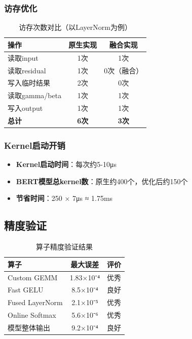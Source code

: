 \documentclass[12pt,a4paper]{article}
\begin{document}
\subsubsection{访存优化}

\begin{table}[H]
\centering
\caption{访存次数对比（以LayerNorm为例）}
\begin{tabular}{lcc}
\toprule
\textbf{操作} & \textbf{原生实现} & \textbf{融合实现} \\
\midrule
读取input & 1次 & 1次 \\
读取residual & 1次 & 0次（融合） \\
写入临时结果 & 2次 & 0次 \\
读取gamma/beta & 1次 & 1次 \\
写入output & 1次 & 1次 \\
\midrule
\textbf{总计} & \textbf{6次} & \textbf{3次} \\
\bottomrule
\end{tabular}
\end{table}

\subsubsection{Kernel启动开销}

\begin{itemize}
    \item \textbf{Kernel启动时间}：每次约5-10μs
    \item \textbf{BERT模型总kernel数}：原生约400个，优化后约150个
    \item \textbf{节省时间}：250 × 7μs ≈ 1.75ms
\end{itemize}

\subsection{精度验证}

\begin{table}[H]
\centering
\caption{算子精度验证结果}
\begin{tabular}{lcc}
\toprule
\textbf{算子} & \textbf{最大误差} & \textbf{评价} \\
\midrule
Custom GEMM & 1.83×10⁻⁴ & 优秀 \\
Fast GELU & 8.5×10⁻⁴ & 良好 \\
Fused LayerNorm & 2.1×10⁻⁵ & 优秀 \\
Online Softmax & 5.6×10⁻⁶ & 优秀 \\
\midrule
模型整体输出 & 9.2×10⁻⁴ & 良好 \\
\bottomrule
\end{tabular}
\end{table}
\end{document}
